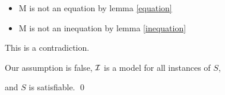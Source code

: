 \documentclass[%
handout,
]{beamer}
\begin{document}
\begin{frame}[allowframebreaks]
    \begin{itemize}
        \item M is not an equation by lemma \ref{equation}
        \item M is not an inequation by lemma \ref{inequation}
    \end{itemize}

    This is a contradiction.

    Our assumption is false,
    $\mathcal{I}$ is a model for all instances of $S$,

    and $S$ is satisfiable.
    \hfill\qed

\end{frame}

%             
%             


%     
%     




\end{document}
